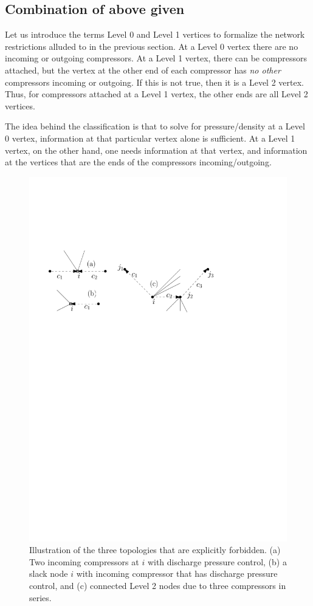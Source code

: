 \documentclass{amsart}
\begin{document}
\subsection{Combination of above given}
Let us introduce the terms Level 0 and Level 1 vertices to formalize the network restrictions alluded to in the previous section. At a Level 0 vertex there are no incoming or outgoing compressors. At a Level 1 vertex, there can be compressors attached, but the vertex at the other end of each compressor has \emph{no other} compressors incoming or outgoing. If this is not true, then it is a Level 2 vertex.
Thus, for compressors attached at a Level 1 vertex, the other ends are all Level 2 vertices. 

The idea behind the classification is that to solve for pressure/density at a Level 0 vertex, information at that particular vertex alone is sufficient. At a Level 1 vertex, on the other hand, one needs information at that vertex, and information at the vertices that are the ends of the compressors incoming/outgoing. 


\begin{figure}[htb]
\centering
\includegraphics[scale=1]{pathologies}
\caption{Illustration of the three topologies that are explicitly forbidden. (a) Two incoming compressors at $i$ with discharge pressure control, (b) a slack node $i$ with incoming compressor that has discharge pressure control, and (c) connected Level 2 nodes due to three compressors in series.}
\label{fig:pathologies}
\end{figure}
\end{document}
